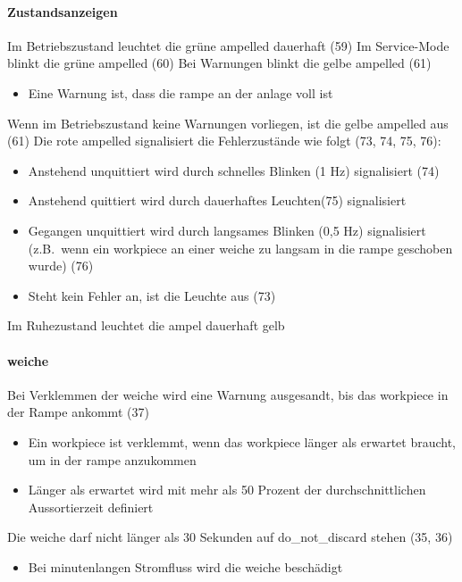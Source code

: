 \paragraph{Zustandsanzeigen}
\begin{itemize}
     Im Betriebszustand leuchtet die grüne \gls{ampelled} dauerhaft (59)
     Im Service-Mode blinkt die grüne \gls{ampelled}  (60)
     Bei Warnungen blinkt die gelbe \gls{ampelled} (61)
    \begin{itemize}
        \item Eine Warnung ist, dass die \gls{rampe} an der \gls{anlage} voll ist
    \end{itemize}
     Wenn im Betriebszustand keine Warnungen vorliegen, ist die gelbe \gls{ampelled} aus (61)
     Die rote \gls{ampelled} signalisiert die Fehlerzustände wie folgt (73, 74, 75, 76):
    \begin{itemize}
        \item Anstehend unquittiert wird durch schnelles Blinken (1 Hz) signalisiert (74)
        \item Anstehend quittiert wird durch dauerhaftes Leuchten(75) signalisiert
        \item Gegangen unquittiert wird durch langsames Blinken (0,5 Hz) signalisiert (z.B.\ wenn ein
        \gls{workpiece} an einer \gls{weiche} zu langsam in die \gls{rampe} geschoben wurde) (76)
        \item Steht kein Fehler an, ist die Leuchte aus (73)
    \end{itemize}
     Im Ruhezustand leuchtet die \gls{ampel} dauerhaft gelb
\end{itemize}

\paragraph{\gls{weiche}}
\begin{itemize}
     Bei Verklemmen der \gls{weiche} wird eine Warnung ausgesandt, bis das \gls{workpiece} in der Rampe ankommt (37)
    \begin{itemize}
        \item Ein \gls{workpiece} ist verklemmt, wenn das \gls{workpiece} länger als erwartet braucht, um in der \gls{rampe} anzukommen
        \item Länger als erwartet wird mit mehr als 50 Prozent der durchschnittlichen Aussortierzeit definiert
    \end{itemize}
     Die \gls{weiche} darf nicht länger als 30 Sekunden auf do\_not\_discard stehen (35, 36)
    \begin{itemize}
        \item Bei minutenlangen Stromfluss wird die \gls{weiche} beschädigt
    \end{itemize}
\end{itemize}

